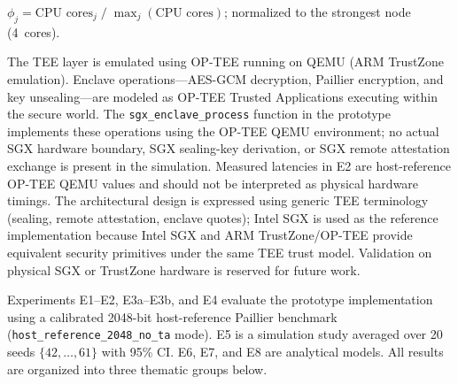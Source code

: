 \documentclass[conference]{IEEEtran}
\begin{document}
    \begin{table}[htbp]
    \caption{Fog Node Hardware Profiles Used in Simulation}
    \label{table:fog-nodes}
    \centering
    \begin{flushleft}
    \footnotesize $\phi_j = \text{CPU cores}_j \;/\; \max_j(\text{CPU cores})$; normalized to the strongest node (4~cores).
    \end{flushleft}
    \end{table}

    The TEE layer is emulated using OP-TEE running on QEMU (ARM TrustZone emulation). Enclave operations---AES-GCM decryption, Paillier encryption, and key unsealing---are modeled as OP-TEE Trusted Applications executing within the secure world. The \texttt{sgx\_enclave\_process} function in the prototype implements these operations using the OP-TEE QEMU environment; no actual SGX hardware boundary, SGX sealing-key derivation, or SGX remote attestation exchange is present in the simulation. Measured latencies in E2 are host-reference OP-TEE QEMU values and should not be interpreted as physical hardware timings. The architectural design is expressed using generic TEE terminology (sealing, remote attestation, enclave quotes); Intel SGX is used as the reference implementation because Intel SGX and ARM TrustZone/OP-TEE provide equivalent security primitives under the same TEE trust model. Validation on physical SGX or TrustZone hardware is reserved for future work.

    Experiments E1--E2, E3a--E3b, and E4 evaluate the prototype implementation using a calibrated 2048-bit host-reference Paillier benchmark (\texttt{host\_reference\_2048\_no\_ta} mode). E5 is a simulation study averaged over 20 seeds $\{42,\ldots,61\}$ with 95\% CI. E6, E7, and E8 are analytical models. All results are organized into three thematic groups below.
\end{document}
